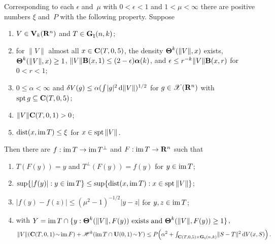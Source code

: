 \begin{lemma}
    \label{al:8.12}
    Corresponding to each $\epsilon$ and~$\mu$ with $0 < \epsilon < 1$ and $1 < \mu < \infty$ there
    are positive numbers $\xi$ and~$P$ with the following property. Suppose
    \begin{enumerate}[label=(\arabic*)]
        \item \label{al:8.12(1)} $V \in \mathbf{V}_{k}(\mathbf{R}^{n})$ and $T \in \mathbf{G}_{\natural}(n,k)$;
        \item \label{al:8.12(2)} for $\|V\|$ almost all $x \in \mathbf{C} ( T, 0, 5 )$, the density
            $\boldsymbol{\Theta}^{k}(\|V\|,x)$ exists, $\boldsymbol{\Theta}^{k}(\|V\|,x) \ge 1$, $\|V\| \mathbf{B}(x,1)
            \le (2 - \epsilon) \boldsymbol{\alpha}(k)$, and $\epsilon \le r^{-k} \|V\| \mathbf{B}(x,r)$
            for $0 < r < 1$;
        \item \label{al:8.12(3)} $0 \le \alpha < \infty$ and $\delta V(g) \le \alpha ({\textstyle\int_{}^{}}
            |g|^2 \,\mathrm{d} \|V\|)^{1/2}$ for $g \in \mathscr{X}(\mathbf{R}^{n})$ with $\operatorname{spt} g \subseteq
            \mathbf{C} ( T, 0, 5 )$;
        \item \label{al:8.12(4)} $\|V\| \mathbf{C} ( T, 0, 1 ) > 0$;
        \item \label{al:8.12(5)} $\operatorname{dist}(x, \operatorname{im} T) \le \xi$ for $x \in \operatorname{spt} \|V\|$.
    \end{enumerate}
    Then there are $f : \operatorname{im} T \to \operatorname{im} T^\perp$ and $F : \operatorname{im} T \to \mathbf{R}^{n}$ such that
    \begin{enumerate}[label=(\arabic*),start=6]
        \item \label{al:8.12(6)} $T(F(y)) = y$ and $T^\perp(F(y)) = f(y)$ for $y \in \operatorname{im} T$;
        \item \label{al:8.12(7)} $\sup \{ |f(y)| : y \in \operatorname{im} T \} \le \sup \{ \operatorname{dist}(x, \operatorname{im} T) : x \in
            \operatorname{spt} \|V\| \}$;
        \item \label{al:8.12(8)} $|f(y) - f(z)| \le (\mu^2 - 1)^{-1/2} |y - z|$ for $y, z \in \operatorname{im} T$;
        \item \label{al:8.12(9)} with $Y = \operatorname{im} T \cap \{ y : \boldsymbol{\Theta}^{k}(\|V\|,F(y)) \text{
            exists and } \boldsymbol{\Theta}^{k}(\|V\|,F(y)) \ge 1 \}$,
            \begin{displaymath}
                \|V\|(\mathbf{C} ( T, 0, 1 ) \!\sim\! \operatorname{im} F) + \mathscr{H}^{k}(\operatorname{im} T \cap \mathbf{U}(0,1) \!\sim\!
                Y) \le P \Big( \alpha^2 + {\textstyle\int_{\mathbf{C} ( T, 0, 5 ) \times
                \mathbf{G}_{\natural}(n,k)}^{}} \|S - T\|^2 \,\mathrm{d} V(x,S) \Big) \,.
            \end{displaymath}
    \end{enumerate}
\end{lemma}


